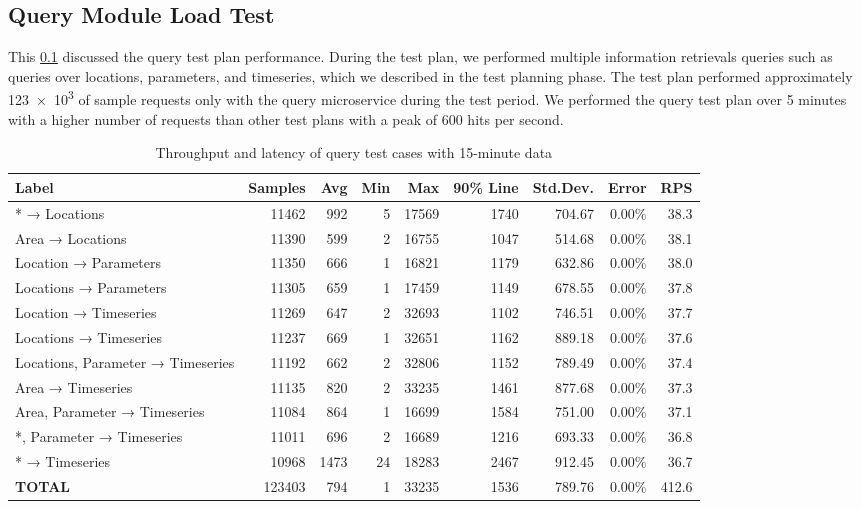 \subsection{Query Module Load Test}
\label{subse:obs_test_plan_query_15min}

This \cref{subse:obs_test_plan_query_15min} discussed the query test plan performance. During the test plan, we performed multiple information retrievals queries such as queries over locations, parameters, and timeseries, which we described in the test planning phase. The test plan performed approximately \num{123e3} of sample requests only with the query microservice during the test period. We performed the query test plan over 5 minutes with a higher number of requests than other test plans with a peak of 600 hits per second.

\begin{table}[ht]
\caption{Throughput and latency of query test cases with 15-minute data}
\footnotesize
\begin{tabulary}{\linewidth}{|L|R|R|R|R|R|R|R|R|}
\hline
\textbf{Label} & \textbf{Samples} & \textbf{Avg} & \textbf{Min} & \textbf{Max} & \textbf{90\% Line} & \textbf{Std.Dev.} & \textbf{Error} & \textbf{RPS} \\ \hline
* → Locations & 11462 & 992 & 5 & 17569 & 1740 & 704.67 & 0.00\% & 38.3 \\ \hline
Area → Locations & 11390 & 599 & 2 & 16755 & 1047 & 514.68 & 0.00\% & 38.1 \\ \hline
Location → Parameters & 11350 & 666 & 1 & 16821 & 1179 & 632.86 & 0.00\% & 38.0 \\ \hline
Locations → Parameters & 11305 & 659 & 1 & 17459 & 1149 & 678.55 & 0.00\% & 37.8 \\ \hline
Location → Timeseries & 11269 & 647 & 2 & 32693 & 1102 & 746.51 & 0.00\% & 37.7 \\ \hline
Locations → Timeseries & 11237 & 669 & 1 & 32651 & 1162 & 889.18 & 0.00\% & 37.6 \\ \hline
Locations, Parameter → Timeseries & 11192 & 662 & 2 & 32806 & 1152 & 789.49 & 0.00\% & 37.4 \\ \hline
Area → Timeseries & 11135 & 820 & 2 & 33235 & 1461 & 877.68 & 0.00\% & 37.3 \\ \hline
Area, Parameter → Timeseries & 11084 & 864 & 1 & 16699 & 1584 & 751.00 & 0.00\% & 37.1 \\ \hline
*, Parameter → Timeseries & 11011 & 696 & 2 & 16689 & 1216 & 693.33 & 0.00\% & 36.8 \\ \hline
* → Timeseries & 10968 & 1473 & 24 & 18283 & 2467 & 912.45 & 0.00\% & 36.7 \\ \hline
\textbf{TOTAL} & 123403 & 794 & 1 & 33235 & 1536 & 789.76 & 0.00\% & 412.6 \\ \hline
\end{tabulary}
\label{tab:obs_query_15_min_summary}
\end{table}

